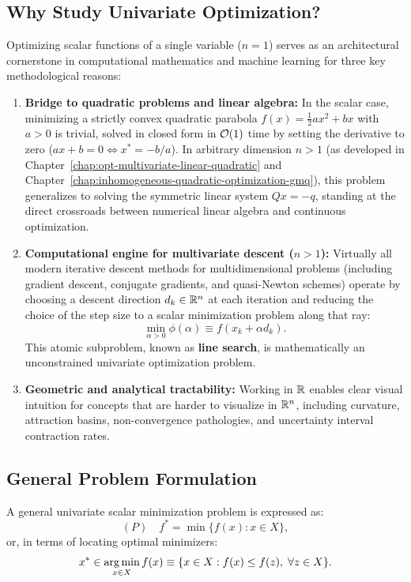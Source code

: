 \subsection{Why Study Univariate Optimization?}
Optimizing scalar functions of a single variable ($n = 1$) serves as an architectural cornerstone in computational mathematics and machine learning for three key methodological reasons:
\begin{enumerate}
    \item \textbf{Bridge to quadratic problems and linear algebra:} In the scalar case, minimizing a strictly convex quadratic parabola $f(x) = \frac{1}{2} a x^2 + b x$ with $a > 0$ is trivial, solved in closed form in $\mathcal{O}\!\left(1\right)$ time by setting the derivative to zero ($a x + b = 0 \iff x^* = -b/a$). In arbitrary dimension $n > 1$ (as developed in Chapter~\ref{chap:opt-multivariate-linear-quadratic} and Chapter~\ref{chap:inhomogeneous-quadratic-optimization-gmq}), this problem generalizes to solving the symmetric linear system $Q x = -q$, standing at the direct crossroads between numerical linear algebra and continuous optimization.
    \item \textbf{Computational engine for multivariate descent ($n > 1$):} Virtually all modern iterative descent methods for multidimensional problems (including gradient descent, conjugate gradients, and quasi-Newton schemes) operate by choosing a descent direction $d_k \in \mathbb{R}^n$ at each iteration and reducing the choice of the step size to a scalar minimization problem along that ray:
    \begin{equation}
        \min_{\alpha > 0} \phi(\alpha) \equiv f(x_k + \alpha d_k).
        \label{eq:line-search-bridge-en}
    \end{equation}
    This atomic subproblem, known as \textbf{line search}, is mathematically an unconstrained univariate optimization problem.
    \item \textbf{Geometric and analytical tractability:} Working in $\mathbb{R}$ enables clear visual intuition for concepts that are harder to visualize in $\mathbb{R}^n$, including curvature, attraction basins, non-convergence pathologies, and uncertainty interval contraction rates.
\end{enumerate}

\subsection{General Problem Formulation}
A general univariate scalar minimization problem is expressed as:
\begin{equation}
    (P) \quad f^* = \min \{ f(x) : x \in X \},
\end{equation}
or, in terms of locating optimal minimizers:
\begin{equation}
    x^* \in \operatorname*{arg\,min}_{x \in X} f(x) \equiv \{ x \in X : f(x) \le f(z), \; \forall z \in X \}.
\end{equation}


